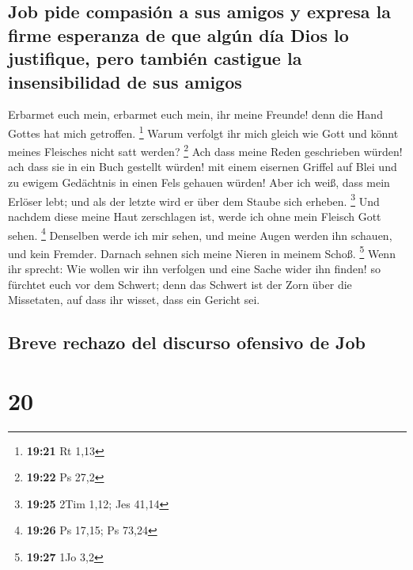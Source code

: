 \hypertarget{job-pide-compasiuxf3n-a-sus-amigos-y-expresa-la-firme-esperanza-de-que-alguxfan-duxeda-dios-lo-justifique-pero-tambiuxe9n-castigue-la-insensibilidad-de-sus-amigos}{%
\subsection{Job pide compasión a sus amigos y expresa la firme esperanza
de que algún día Dios lo justifique, pero también castigue la
insensibilidad de sus
amigos}\label{job-pide-compasiuxf3n-a-sus-amigos-y-expresa-la-firme-esperanza-de-que-alguxfan-duxeda-dios-lo-justifique-pero-tambiuxe9n-castigue-la-insensibilidad-de-sus-amigos}}

 Erbarmet euch mein, erbarmet euch mein, ihr meine
Freunde! denn die Hand Gottes hat mich getroffen. \footnote{\textbf{19:21}
  Rt 1,13}  Warum verfolgt ihr mich gleich wie Gott und
könnt meines Fleisches nicht satt werden? \footnote{\textbf{19:22} Ps
  27,2}  Ach dass meine Reden geschrieben würden! ach
dass sie in ein Buch gestellt würden!  mit einem eisernen
Griffel auf Blei und zu ewigem Gedächtnis in einen Fels gehauen würden!
 Aber ich weiß, dass mein Erlöser lebt; und als der
letzte wird er über dem Staube sich erheben. \footnote{\textbf{19:25}
  2Tim 1,12; Jes 41,14}  Und nachdem diese meine Haut
zerschlagen ist, werde ich ohne mein Fleisch Gott sehen. \footnote{\textbf{19:26}
  Ps 17,15; Ps 73,24}  Denselben werde ich mir sehen, und
meine Augen werden ihn schauen, und kein Fremder. Darnach sehnen sich
meine Nieren in meinem Schoß. \footnote{\textbf{19:27} 1Jo 3,2}
 Wenn ihr sprecht: Wie wollen wir ihn verfolgen und eine
Sache wider ihn finden!  so fürchtet euch vor dem
Schwert; denn das Schwert ist der Zorn über die Missetaten, auf dass ihr
wisset, dass ein Gericht sei.

\hypertarget{breve-rechazo-del-discurso-ofensivo-de-job}{%
\subsection{Breve rechazo del discurso ofensivo de
Job}\label{breve-rechazo-del-discurso-ofensivo-de-job}}

\hypertarget{section-19}{%
\section{20}\label{section-19}}

